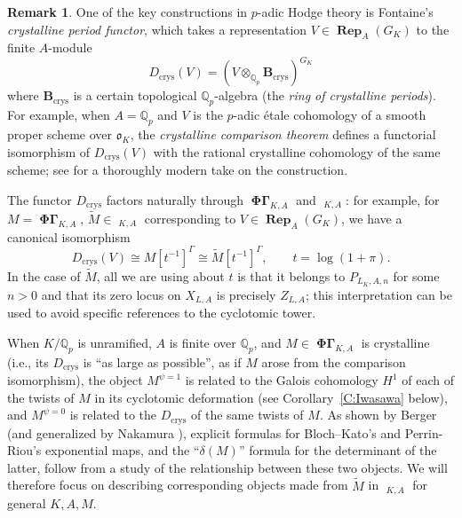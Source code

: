 \documentclass[12pt]{amsart}
\theoremstyle{definition}
\newtheorem{remark}[theorem]{Remark}
\numberwithin{equation}{theorem}
\newcommand{\bB}{\mathbf{B}}
\newcommand{\QQ}{\mathbb{Q}}
\newcommand{\frako}{\mathfrak{o}}
\DeclareMathOperator{\PhiGamma}{\mathbf{\Phi \Gamma}}
\DeclareMathOperator{\PhiGammatilde}{\widetilde{\mathbf{\Phi \Gamma}}}
\DeclareMathOperator{\Rep}{\mathbf{Rep}}
\begin{document}
\begin{remark} \label{R:berger explicit}
One of the key constructions in $p$-adic Hodge theory is Fontaine's \emph{crystalline period functor}, which takes a representation $V \in \Rep_A(G_K)$ to the finite $A$-module
\[
D_{\mathrm{crys}}(V) = (V \otimes_{\QQ_p} \bB_{\mathrm{crys}})^{G_K}
\]
where $\bB_{\mathrm{crys}}$ is a certain topological $\QQ_p$-algebra (the \emph{ring of crystalline periods}). For example, when $A = \QQ_p$ and $V$ is the $p$-adic \'etale cohomology of a smooth proper scheme over $\frako_K$, the \emph{crystalline comparison theorem} defines a functorial isomorphism of $D_{\mathrm{crys}}(V)$ with the rational crystalline cohomology of the same scheme; see \cite{bhatt-morrow-scholze} for a thoroughly modern take on the construction.

The functor $D_{\mathrm{crys}}$ factors naturally through $\PhiGamma_{K,A}$
and $\PhiGammatilde_{K,A}$: for example, for $M = \PhiGamma_{K,A}$,
$\tilde{M} \in \PhiGammatilde_{K,A}$
corresponding to $V \in \Rep_A(G_K)$, we have a canonical isomorphism
\[
D_{\mathrm{crys}}(V) \cong M[t^{-1}]^\Gamma \cong \tilde{M}[t^{-1}]^{\Gamma}, \qquad
t = \log(1+\pi).
\]
In the case of $\tilde{M}$, all we are using about $t$ is that it belongs to $P_{L_K, A, n}$
for some $n>0$ and that its zero locus on $X_{L,A}$ is precisely $Z_{L,A}$; this interpretation can be used to avoid specific references to the cyclotomic tower.

When $K/\QQ_p$ is unramified, $A$ is finite over $\QQ_p$, and $M \in \PhiGamma_{K,A}$ is crystalline (i.e., its $D_{\mathrm{crys}}$ is ``as large as possible'', as if $M$ arose from the comparison isomorphism), the object $M^{\psi=1}$ is related to the Galois
cohomology $H^1$ of each of the twists of $M$ in its cyclotomic
deformation (see Corollary~\ref{C:Iwasawa} below), and $M^{\psi=0}$ is related to the $D_{\mathrm{crys}}$ of the same twists
of $M$.  As shown by Berger \cite{berger-explicit} (and generalized by Nakamura \cite{nakamura}),
explicit formulas for Bloch--Kato's and Perrin-Riou's exponential maps,
and the ``$\delta(M)$'' formula for the determinant of the latter,
follow from a study of the relationship between these two objects.  We
will therefore focus on describing corresponding
objects made from $\tilde{M}$ in $\PhiGammatilde_{K,A}$ for general $K,A,M$.
\end{remark}
\end{document}
